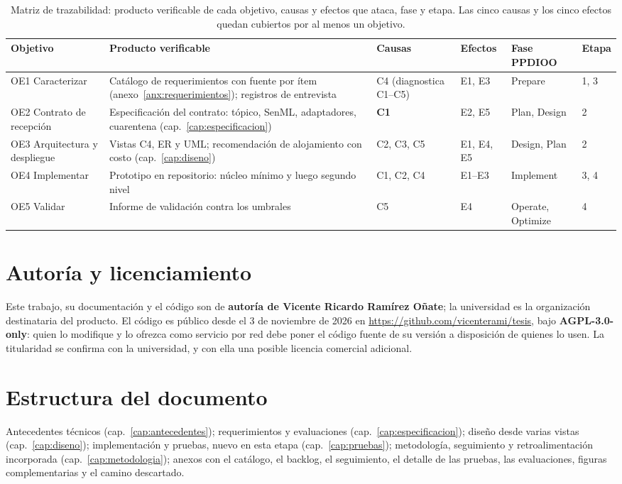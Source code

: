 \begin{table}[H]
\centering\footnotesize
\begin{tablaseg}
\begin{tabular}{@{}L{2.9cm}L{3.5cm}L{1.9cm}L{1.3cm}L{2.2cm}C{0.9cm}@{}}
\toprule
\textbf{Objetivo} & \textbf{Producto verificable} & \textbf{Causas} & \textbf{Efectos} & \textbf{Fase PPDIOO} & \textbf{Etapa} \\
\midrule
OE1 Caracterizar & Catálogo de requerimientos con fuente por ítem (anexo~\ref{anx:requerimientos}); registros de entrevista & C4 (diagnostica C1--C5) & E1, E3 & Prepare & 1, 3 \\
OE2 Contrato de recepción & Especificación del contrato: tópico, SenML, adaptadores, cuarentena (cap.~\ref{cap:especificacion}) & \textbf{C1} & E2, E5 & Plan, Design & 2 \\
OE3 Arquitectura y despliegue & Vistas C4, ER y UML; recomendación de alojamiento con costo (cap.~\ref{cap:diseno}) & C2, C3, C5 & E1, E4, E5 & Design, Plan & 2 \\
OE4 Implementar & Prototipo en repositorio: núcleo mínimo y luego segundo nivel & C1, C2, C4 & E1--E3 & Implement & 3, 4 \\
OE5 Validar & Informe de validación contra los umbrales & C5 & E4 & Operate, Optimize & 4 \\
\bottomrule
\end{tabular}
\end{tablaseg}
\caption{Matriz de trazabilidad: producto verificable de cada objetivo, causas y efectos que ataca,
fase y etapa. Las cinco causas y los cinco efectos quedan cubiertos por al menos un objetivo.}
\label{tab:trazabilidad}
\end{table}

\section{Autoría y licenciamiento}

Este trabajo, su documentación y el código son de \textbf{autoría de Vicente Ricardo Ramírez Oñate};
la universidad es la organización destinataria del producto. El código es público desde el 3 de noviembre de 2026 en \url{https://github.com/vicenterami/tesis}, bajo \textbf{AGPL-3.0-only}: quien lo modifique y lo ofrezca como servicio por red debe poner el código fuente de su versión a disposición de quienes lo usen. La titularidad se
confirma con la universidad, y con ella una posible licencia comercial adicional.

\section{Estructura del documento}

Antecedentes técnicos (cap.~\ref{cap:antecedentes}); requerimientos y evaluaciones
(cap.~\ref{cap:especificacion}); diseño desde varias vistas
(cap.~\ref{cap:diseno}); implementación y pruebas, nuevo en esta etapa (cap.~\ref{cap:pruebas}); metodología,
seguimiento y retroalimentación incorporada (cap.~\ref{cap:metodologia}); anexos con el catálogo, el backlog, el seguimiento, el detalle de las pruebas, las
evaluaciones, figuras complementarias y el camino descartado.
